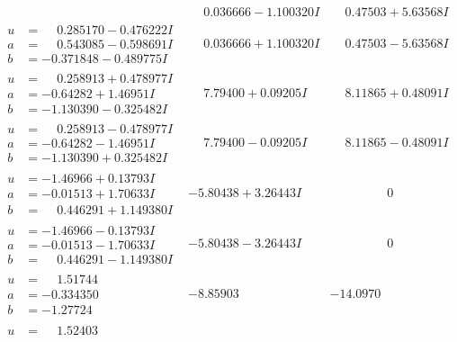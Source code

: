 \documentclass[1p]{elsarticle_modified}
\theoremstyle{definition}
\begin{document}
$$\begin{array}{c|c|c}
 & \phantom{-}0.036666 - 1.100320 I & \phantom{-}0.47503 + 5.63568 I \\ \hline\begin{aligned}
u &= \phantom{-}0.285170 - 0.476222 I \\
a &= \phantom{-}0.543085 - 0.598691 I \\
b &= -0.371848 - 0.489775 I\end{aligned}
 & \phantom{-}0.036666 + 1.100320 I & \phantom{-}0.47503 - 5.63568 I \\ \hline\begin{aligned}
u &= \phantom{-}0.258913 + 0.478977 I \\
a &= -0.64282 + 1.46951 I \\
b &= -1.130390 - 0.325482 I\end{aligned}
 & \phantom{-}7.79400 + 0.09205 I & \phantom{-}8.11865 + 0.48091 I \\ \hline\begin{aligned}
u &= \phantom{-}0.258913 - 0.478977 I \\
a &= -0.64282 - 1.46951 I \\
b &= -1.130390 + 0.325482 I\end{aligned}
 & \phantom{-}7.79400 - 0.09205 I & \phantom{-}8.11865 - 0.48091 I \\ \hline\begin{aligned}
u &= -1.46966 + 0.13793 I \\
a &= -0.01513 + 1.70633 I \\
b &= \phantom{-}0.446291 + 1.149380 I\end{aligned}
 & -5.80438 + 3.26443 I & \phantom{-0.000000 } 0 \\ \hline\begin{aligned}
u &= -1.46966 - 0.13793 I \\
a &= -0.01513 - 1.70633 I \\
b &= \phantom{-}0.446291 - 1.149380 I\end{aligned}
 & -5.80438 - 3.26443 I & \phantom{-0.000000 } 0 \\ \hline\begin{aligned}
u &= \phantom{-}1.51744\phantom{ +0.000000I} \\
a &= -0.334350\phantom{ +0.000000I} \\
b &= -1.27724\phantom{ +0.000000I}\end{aligned}
 & -8.85903\phantom{ +0.000000I} & -14.0970\phantom{ +0.000000I} \\ \hline\begin{aligned}
u &= \phantom{-}1.52403\phantom{ +0.000000I} \\

\end{aligned}
\end{array}$$
\end{document}
